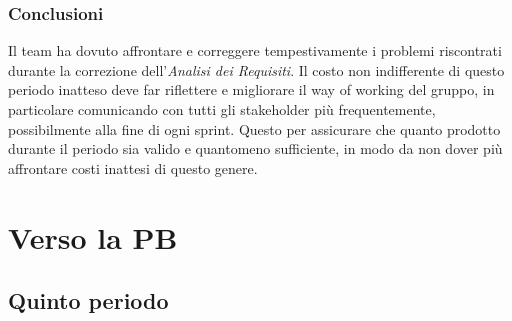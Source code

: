 \subsubsection{Conclusioni}
Il team ha dovuto affrontare e correggere tempestivamente i problemi riscontrati durante la correzione dell'\textit{Analisi dei Requisiti}. Il costo non indifferente di questo periodo inatteso deve far riflettere e migliorare il way of working del gruppo, in particolare comunicando con tutti gli stakeholder più frequentemente, possibilmente alla fine di ogni sprint. Questo per assicurare che quanto prodotto durante il periodo sia valido e quantomeno sufficiente, in modo da non dover più affrontare costi inattesi di questo genere.

\newpage
\section{Verso la PB}

\subsection{Quinto periodo}
